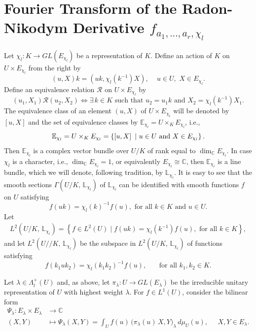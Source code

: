 \documentclass[11pt,a4paper]{amsart}
\theoremstyle{definition}
\numberwithin{equation}{section}
\begin{document}
\section{Fourier Transform of the Radon-Nikodym Derivative $f_{a_1,\dots ,a_r,\chi_l}$}	\label{Fourier Transform}
Let $\chi_l:K \longrightarrow GL\left(E_{\chi_l} \right) $ be a representation of $K$. Define an action of $K$ on $U \times E_{\chi_l}$ from the right by
\[
\left(u,X \right)k=\left(uk, \chi_l\left(k^{-1}\right)  X \right), \, \, \, \,\, \,\,  u \in U, \, \, X \in E_{\chi_l}. 
\]
Define an equivalence relation $\mathcal{R}$ on $U \times E_{\chi_l}$ by
\[
\left(u_1,X_1 \right) \mathcal{R} \left( u_2,X_2\right) \Leftrightarrow  \exists\, k \in K \text{ such that } u_2=u_1k \text{ and } X_2=\chi_l\left( k^{-1}\right)X_1. 
\]
The equivalence class of an element $\left(u,X \right) $ of $U \times E_{\chi_l}$ will be denoted by $\left[ u,X\right]$ and the set of equivalence classes by ${\mathbb{E}_{\chi_l}}=U\times_K E_{\chi_l}$, i.e.,
\[
{\mathbb{E}_{\chi_l}}=U\times_K E_{\chi_l}=\left\lbrace  \left[ u,X\right]\,\, \arrowvert \, \, u\in U \text{ and } X \in E_{\chi_l} \right\rbrace. 
\]
Then $\mathbb{E}_{\chi_l}$ is a complex vector bundle over $U/K$ of rank equal to  $\dim_{\mathbb{C}}E_{\chi_l} $.
In case $\chi_l$ is a character, i.e., $\dim_{\mathbb{C}} E_{\chi_l} =1$, or equivalently $E_{\chi_l} \cong \mathbb{C}$, then $\mathbb{E}_{\chi_l}$ is a line bundle, which we will denote, following tradition, by $\mathbb{L}_{\chi_l}$. It is easy to see that the smooth sections $\Gamma\left(U/K, \, \mathbb{L}_{\chi_l}\right) $ of $\mathbb{L}_{\chi_l}$ can be identified with smooth functions $f$ on $U$ satisfying 
$$
f\left( uk\right)=\chi_l(k)^{-1}f\left(u \right), \mbox{ for all } k\in K \mbox{ and } u \in U.
$$
Let \begin{align*}
L^2 \left(U/K, \, \mathbb{L}_{\chi_l}\right)= \left\{  f\in L^2(U) \mid f( uk)=\chi_l(k^{-1})  f(u), \text{ for all } k\in K  \right\},
\end{align*}
and let $L^2 \left(U//K, \, \mathbb{L}_{\chi_l}\right)$ be the subspace in  $L^2 \left(U/K, \, \mathbb{L}_{\chi_l}\right)$ of functions satisfying  $$f(k_1uk_2) =\chi_l( k_1k_2 )^{-1} f(u), \,\,\,\,\,\,\,\,\, \text{ for all }  k_1, k_2\in K.$$
 
Let $\lambda \in \Lambda^+_l\left(U\right)$ and, as above, let $\pi_{\lambda}:U \longrightarrow GL(E_{\lambda})$ be the irreducible unitary representation of $U$ with highest weight $\lambda$. 
For $f \in L^1(U)$, consider the bilinear form
\begin{align*}
 \Psi_\lambda :E_{\lambda} \times E_{\lambda}&\longrightarrow  \mathbb{C}  \\
(X,Y)& \longmapsto \Psi_\lambda (X,Y) =\int_U f(u)\,\bigl( \pi_{\lambda}(u)\,X, Y\bigr)_\lambda \, d\mu_U(u),\;\;\;\;\;X, Y \in E_{\lambda}.
\end{align*}
 
\end{document}
